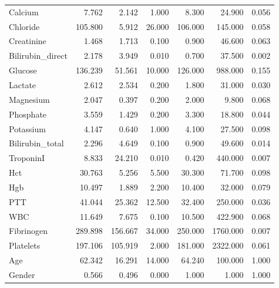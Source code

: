\begin{table}
\begin{tabular}{lrrrrrr}
Calcium          &   7.762 &              2.142 &     1.000 &   8.300 &   24.900 &           0.056 \\
Chloride         & 105.800 &              5.912 &    26.000 & 106.000 &  145.000 &           0.058 \\
Creatinine       &   1.468 &              1.713 &     0.100 &   0.900 &   46.600 &           0.063 \\
Bilirubin\_direct &   2.178 &              3.949 &     0.010 &   0.700 &   37.500 &           0.002 \\
Glucose          & 136.239 &             51.561 &    10.000 & 126.000 &  988.000 &           0.155 \\
Lactate          &   2.612 &              2.534 &     0.200 &   1.800 &   31.000 &           0.030 \\
Magnesium        &   2.047 &              0.397 &     0.200 &   2.000 &    9.800 &           0.068 \\
Phosphate        &   3.559 &              1.429 &     0.200 &   3.300 &   18.800 &           0.044 \\
Potassium        &   4.147 &              0.640 &     1.000 &   4.100 &   27.500 &           0.098 \\
Bilirubin\_total  &   2.296 &              4.649 &     0.100 &   0.900 &   49.600 &           0.014 \\
TroponinI        &   8.833 &             24.210 &     0.010 &   0.420 &  440.000 &           0.007 \\
Hct              &  30.763 &              5.256 &     5.500 &  30.300 &   71.700 &           0.098 \\
Hgb              &  10.497 &              1.889 &     2.200 &  10.400 &   32.000 &           0.079 \\
PTT              &  41.044 &             25.362 &    12.500 &  32.400 &  250.000 &           0.036 \\
WBC              &  11.649 &              7.675 &     0.100 &  10.500 &  422.900 &           0.068 \\
Fibrinogen       & 289.898 &            156.667 &    34.000 & 250.000 & 1760.000 &           0.007 \\
Platelets        & 197.106 &            105.919 &     2.000 & 181.000 & 2322.000 &           0.061 \\
Age              &  62.342 &             16.291 &    14.000 &  64.240 &  100.000 &           1.000 \\
Gender           &   0.566 &              0.496 &     0.000 &   1.000 &    1.000 &           1.000 \\

\end{tabular}
\end{table}
